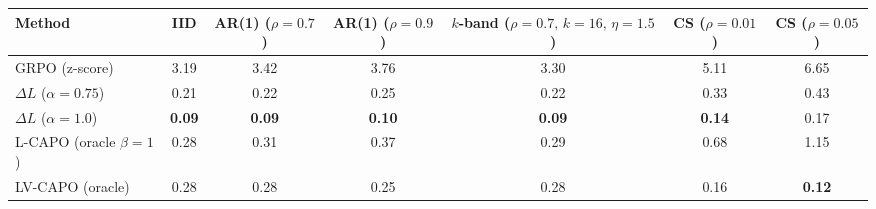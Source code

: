 \begin{tabular}{lcccccc}
\toprule
Method & IID & AR(1) ($\rho=0.7$) & AR(1) ($\rho=0.9$) & $k$-band ($\rho=0.7,\,k=16,\,\eta=1.5$) & CS ($\rho=0.01$) & CS ($\rho=0.05$) \\
\midrule
GRPO (z-score) & 3.19 & 3.42 & 3.76 & 3.30 & 5.11 & 6.65 \\
$\Delta L$ ($\alpha=0.75$) & 0.21 & 0.22 & 0.25 & 0.22 & 0.33 & 0.43 \\
$\Delta L$ ($\alpha=1.0$) & \textbf{0.09} & \textbf{0.09} & \textbf{0.10} & \textbf{0.09} & \textbf{0.14} & 0.17 \\
L-CAPO (oracle $\beta=1$) & 0.28 & 0.31 & 0.37 & 0.29 & 0.68 & 1.15 \\
LV-CAPO (oracle) & 0.28 & 0.28 & 0.25 & 0.28 & 0.16 & \textbf{0.12} \\
\bottomrule
\end{tabular}
